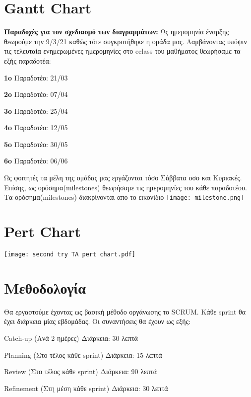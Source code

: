 \documentclass[12pt,a4paper,oneside]{article}
\begin{document}
\section{Gantt Chart}\label{sec:lit-rev}
\textbf{Παραδοχές για τον σχεδιασμό των διαγραμμάτων:}
\vspace{2mm}
\newline
 Ως ημερομηνία έναρξης θεωρούμε την 9/3/21 καθώς τότε συγκροτήθηκε η ομάδα μας. Λαμβάνοντας υπόψιν τις τελευταία ενημερωμένες ημερομηνίες στο eclass του μαθήματος θεωρήσαμε τα εξής παραδοτέα:
 \newline
 
 \centerline {\textbf{1o} Παραδοτέο: 21/03}
 \centerline  {\textbf{2o} Παραδοτέο: 07/04}
 \centerline  {\textbf{3o} Παραδοτέο: 25/04}
 \centerline  {\textbf{4o} Παραδοτέο: 12/05}
 \centerline  {\textbf{5o} Παραδοτέο: 30/05}
 \centerline  {\textbf{6o} Παραδοτέο: 06/06}
 \vspace{2mm}
 Ως φοιτητές τα μέλη της ομάδας μας εργάζονται τόσο Σάββατα οσο και Κυριακές. Επίσης, ως ορόσημα(milestones) θεωρήσαμε τις ημερομηνίες του κάθε παραδοτέου. Τα ορόσημα(milestones) διακρίνονται απο το εικονίδιο \space
   \texttt{[image: milestone.png]}
 
\begin{center}

    
\end{center}

\section{Pert Chart}\label{sec:lit-rev}




 
\centerline{\texttt{[image: second try ΤΛ pert chart.pdf]}}

\newpage 
\section{Μεθοδολογία}\label{sec:meth}

Θα εργαστούμε έχοντας ως βασική μέθοδο οργάνωσης το SCRUM. Κάθε sprint θα έχει διάρκεια μίας εβδομάδας. Οι συναντήσεις θα έχουν ως  εξής: 
 \begin{center}
Catch-up (Ανά 2 ημέρες) Διάρκεια: 30 λεπτά 

Planning (Στο τέλος κάθε sprint) Διάρκεια: 15 λεπτά 

Review (Στο τέλος κάθε sprint) Διάρκεια: 90 λεπτά 

Refinement (Στη μέση κάθε sprint) Διάρκεια: 30 λεπτά 
\end{center}
 
\end{document}
